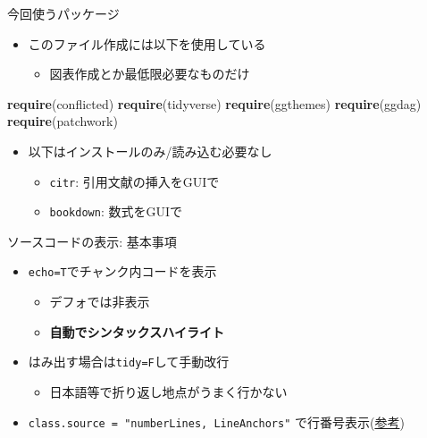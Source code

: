 \documentclass[
  12pt,
  ignorenonframetext,
]{beamer}
\newenvironment{Shaded}{\begin{snugshade}}{\end{snugshade}}
\newcommand{\KeywordTok}[1]{\textcolor[rgb]{0.13,0.29,0.53}{\textbf{#1}}}
\newcommand{\NormalTok}[1]{#1}
\providecommand{\tightlist}{%
  \setlength{\itemsep}{0pt}\setlength{\parskip}{0pt}}
\begin{document}
\begin{frame}[fragile]{今回使うパッケージ}
\protect\hypertarget{ux4ecaux56deux4f7fux3046ux30d1ux30c3ux30b1ux30fcux30b8}{}

\begin{itemize}
\tightlist
\item
  このファイル作成には以下を使用している

  \begin{itemize}
  \tightlist
  \item
    図表作成とか最低限必要なものだけ
  \end{itemize}
\end{itemize}

\begin{Shaded}
\begin{Highlighting}[numbers=left,,]
\KeywordTok{require}\NormalTok{(conflicted)}
\KeywordTok{require}\NormalTok{(tidyverse)}
\KeywordTok{require}\NormalTok{(ggthemes)}
\KeywordTok{require}\NormalTok{(ggdag)}
\KeywordTok{require}\NormalTok{(patchwork)}
\end{Highlighting}
\end{Shaded}

\begin{itemize}
\tightlist
\item
  以下はインストールのみ/読み込む必要なし

  \begin{itemize}
  \tightlist
  \item
    \texttt{citr}: 引用文献の挿入をGUIで
  \item
    \texttt{bookdown}: 数式をGUIで
  \end{itemize}
\end{itemize}

\end{frame}

\begin{frame}[fragile]{ソースコードの表示: 基本事項}
\protect\hypertarget{ux30bdux30fcux30b9ux30b3ux30fcux30c9ux306eux8868ux793a-ux57faux672cux4e8bux9805}{}

\begin{itemize}
\tightlist
\item
  \texttt{echo=T}でチャンク内コードを表示

  \begin{itemize}
  \tightlist
  \item
    デフォでは非表示
  \item
    \textbf{自動でシンタックスハイライト}
  \end{itemize}
\item
  はみ出す場合は\texttt{tidy=F}して手動改行

  \begin{itemize}
  \tightlist
  \item
    日本語等で折り返し地点がうまく行かない
  \end{itemize}
\item
  \texttt{class.source\ =\ "numberLines,\ LineAnchors"}
  で行番号表示(\href{https://blog.atusy.net/2019/04/18/rmd-line-num/}{参考})
\end{itemize}

\end{frame}
\end{document}
